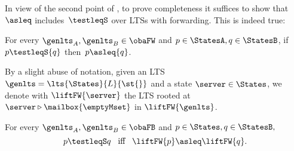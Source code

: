 
\renewcommand{\serverA}{p}
\renewcommand{\serverB}{q}



In view of the second point of ,
to prove completeness it suffices to show that~$\asleq$
includes~$\testleqS$ over LTSs with
forwarding. This is indeed true:
\begin{lemma}
  \label{lem:completenessA}
  For every $\genlts_A, \genlts_B \in \obaFW$ and
  $\serverA \in \StatesA, \serverB \in \StatesB $,
  if ${ \serverA } \testleqS { \serverB }$
  then~${ \serverA } \asleq { \serverB }$.
\end{lemma}


By a slight abuse of notation,
given an LTS $\genlts = \lts{\States}{L}{\st{}}$ and a state
$\server \in \States$,
we denote with $\liftFW{
  \server }$ the LTS rooted at $\server \triangleright \mailbox{ \emptyMset }$ in $\liftFW{\genlts}$.


\begin{theorem}%
  \label{thm:testleqS-equals-bhvleq}
  \label{thm:testleqS-equals-accleq}
  \label{thm:testleqS-equals-asleq}
  For every $\genlts_A, \genlts_B \in \obaFB$
  and $\serverA \in \States, \serverB \in \StatesB,$
  \begin{equation*}
    \serverA \testleqS \serverB \;\;\;\text{iff}\;\;\;
  \liftFW{\serverA} \asleq \liftFW{\serverB}.
  \end{equation*}
\end{theorem}

